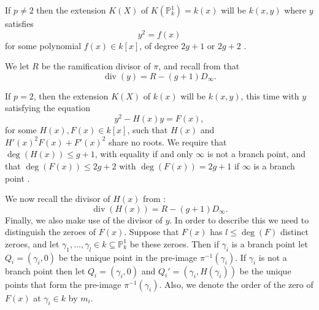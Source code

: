 \documentclass[draft, 11pt]{article} %
\theoremstyle{plain}
\theoremstyle{remark}
\DeclareMathOperator{\di}{div}
\begin{document}
If $p \neq 2$ then the extension $K(X)$ of $K(\mathbb P_k^1) = k(x)$ will be $k(x,y)$ where $y$ satisfies
\begin{equation}\label{definingequationpnot2}
y^2 = f(x)
\end{equation}
for some polynomial $f(x) \in k[x]$, of degree $2g+1$ or $2g+2$ \cite[Prop 7.4.24]{liu}.

We let $R$ be the ramification divisor of $\pi$, and recall from \cite[\S 6]{faithfulaction} that
\begin{equation}\label{pnot2divisors}
\di(y)  = R - (g+1)D_\infty.
\end{equation}


If $p=2$, then the extension $K(X)$ of $k(x)$ will be $k(x,y)$, this time with $y$ satisfying the equation
\begin{equation}\label{definep=2}
y^2 - H(x)y = F(x),
\end{equation}
for some $H(x),F(x) \in k[x]$, such that $H(x)$ and $H'(x)^2F(x) + F'(x)^2$ share no roots.
We require that $\deg(H(x)) \leq g+1$, with equality if and only $\infty$ is not a branch point, and that $\deg(F(x)) \leq 2g+2$ with $\deg(F(x)) = 2g+1$ if $\infty$ is a branch point  \cite[Prop 7.4.24]{liu}.


We now recall the divisor of $H(x)$ from \cite[\S 6]{faithfulaction}:
\begin{equation}\label{divisorofH}
\di (H(x))  = R - (g+1)D_\infty. 
\end{equation}
Finally, we also make use of the divisor of $y$. 
In order to describe this we need to distinguish the zeroes of $F(x)$.
Suppose that $F(x)$ has $l \leq \deg(F)$ distinct zeroes, and let $\gamma_1, \ldots, \gamma_l \in k \subseteq \mathbb P_k^1$ be these zeroes.
Then if $\gamma_i$ is a branch point let $Q_i = (\gamma_i, 0)$ be the unique point in the pre-image $\pi^{-1}(\gamma_i)$.
If $\gamma_i$ is not a branch point then let $Q_i = (\gamma_i, 0)$ and $Q_i' = (\gamma_i, H(\gamma_i))$ be the unique points that form the pre-image $\pi^{-1}(\gamma_i)$.
Also, we denote the order of the zero of $F(x)$ at $\gamma_i \in k$ by $m_i$.
\end{document}
